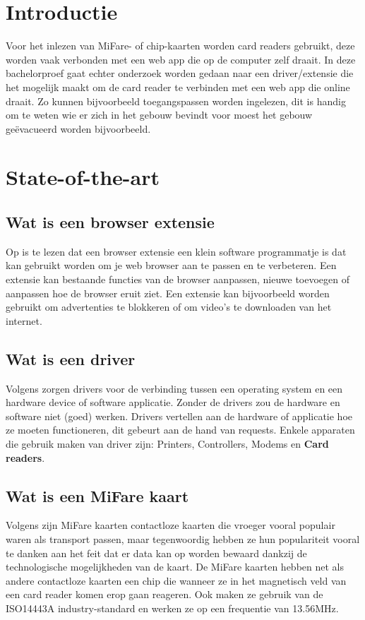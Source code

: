 
\section{Introductie}%
\label{sec:introductie}

Voor het inlezen van MiFare- of chip-kaarten worden card readers gebruikt, deze worden vaak verbonden met een web app die op de computer zelf draait. In deze bachelorproef gaat echter onderzoek worden gedaan naar een driver/extensie die het mogelijk maakt om de card reader te verbinden met een web app die online draait. Zo kunnen bijvoorbeeld toegangspassen worden ingelezen, dit is handig om te weten wie er zich in het gebouw bevindt voor moest het gebouw geëvacueerd worden bijvoorbeeld.


\section{State-of-the-art}%
\label{sec:state-of-the-art}

\subsection{Wat is een browser extensie}
Op \textcite{Desktop.com} is te lezen dat een browser extensie een klein software programmatje is dat kan gebruikt worden om je web browser aan te passen en te verbeteren. Een extensie kan bestaande functies van de browser aanpassen, nieuwe toevoegen of aanpassen hoe de browser eruit ziet.
Een extensie kan bijvoorbeeld worden gebruikt om advertenties te blokkeren of om video's te downloaden van het internet.

\subsection{Wat is een driver}
Volgens \textcite{Webopedia} zorgen drivers voor de verbinding tussen een operating system en een hardware device of software applicatie. Zonder de drivers zou de hardware en software niet (goed) werken. Drivers vertellen aan de hardware of applicatie hoe ze moeten functioneren, dit gebeurt aan de hand van requests. Enkele apparaten die gebruik maken van driver zijn: Printers, Controllers, Modems en \textbf{Card readers}.

\subsection{Wat is een MiFare kaart}
Volgens \textcite{Digitalid} zijn MiFare kaarten contactloze kaarten die vroeger vooral populair waren als transport passen, maar tegenwoordig hebben ze hun populariteit vooral te danken aan het feit dat er data kan op worden bewaard dankzij de technologische mogelijkheden van de kaart.
De MiFare kaarten hebben net als andere contactloze kaarten een chip die wanneer ze in het magnetisch veld van een card reader komen erop gaan reageren. Ook maken ze gebruik van de ISO14443A industry-standard en werken ze op een frequentie van 13.56MHz.

